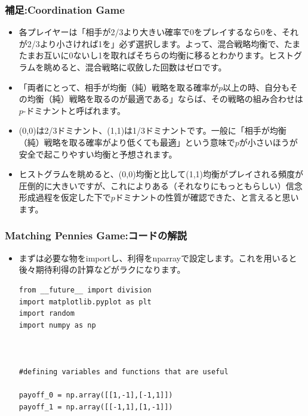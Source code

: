 \documentclass[dvipdfmx,fleqn]{beamer}
\begin{document}
\begin{frame}
\frametitle{補足:Coordination Game}
\begin{itemize}\setlength{\parskip}{0.5em}
\item
各プレイヤーは「相手が2/3より大きい確率で0をプレイするなら0を、それが2/3より小さければ1を」必ず選択します。よって、混合戦略均衡で、たまたまお互いに0ないし1を取ればそちらの均衡に移るとわかります。ヒストグラムを眺めると、混合戦略に収斂した回数はゼロです。 \pause
\item
「両者にとって、相手が均衡（純）戦略を取る確率が$p$以上の時、自分もその均衡（純）戦略を取るのが最適である」ならば、その戦略の組み合わせは$p$-ドミナントと呼ばれます。\pause
\item
(0,0)は2/3ドミナント、(1,1)は1/3ドミナントです。一般に「相手が均衡（純）戦略を取る確率がより低くても最適」という意味で$p$が小さいほうが安全で起こりやすい均衡と予想されます。\pause
\item
ヒストグラムを眺めると、(0,0)均衡と比して(1,1)均衡がプレイされる頻度が圧倒的に大きいですが、これによりある（それなりにもっともらしい）信念形成過程を仮定した下で$p$ドミナントの性質が確認できた、と言えると思います。

\end{itemize}
\end{frame}




\begin{frame}[containsverbatim]%
\frametitle{Matching Pennies Game:コードの解説}
\begin{itemize}\setlength{\parskip}{0.5em}
\item
まずは必要な物をimportし、利得をnparrayで設定します。これを用いると後々期待利得の計算などがラクになります。
\begin{verbatim}
from __future__ import division
import matplotlib.pyplot as plt
import random 
import numpy as np



#defining variables and functions that are useful

payoff_0 = np.array([[1,-1],[-1,1]])
payoff_1 = np.array([[-1,1],[1,-1]])


\end{verbatim}

\
\end{itemize}
\end{frame}
\end{document}
